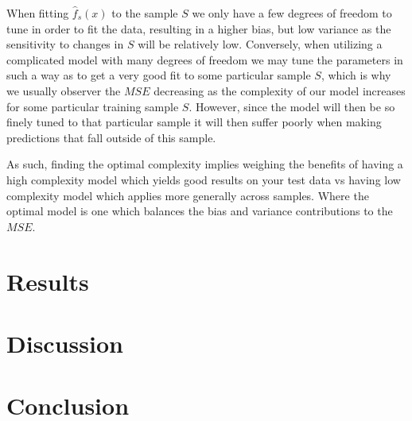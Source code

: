 \documentclass[reprint, english, nofootinbib]{revtex4-2}
\begin{document}
        When fitting $\hat f_s(x)$ to the sample $S$ we only have a few degrees of freedom to tune in order to fit the data, resulting in a higher bias, but low variance as the sensitivity to changes in $S$ will be relatively low. Conversely, when utilizing a complicated model with many degrees of freedom we may tune the parameters in such a way as to get a very good fit to some particular sample $S$, which is why we usually observer the $MSE$ decreasing as the complexity of our model increases for some particular training sample $S$. However, since the model will then be so finely tuned to that particular sample it will then suffer poorly when making predictions that fall outside of this sample.

        As such, finding the optimal complexity implies weighing the benefits of having a high complexity model which yields good results on your test data vs having low complexity model which applies more generally across samples. Where the optimal model is one which balances the bias and variance contributions to the $MSE$.


\section{Results}

\section{Discussion}

\section{Conclusion}

\onecolumngrid

\newpage
\twocolumngrid
\appendix
\end{document}
